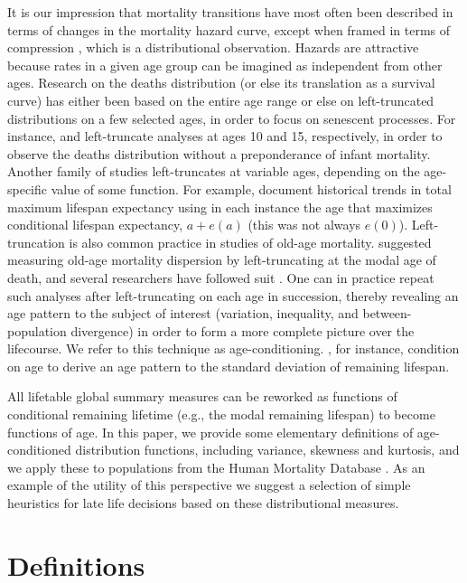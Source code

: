 \documentclass{article}
\begin{document}
It is our impression that mortality transitions have most
often been described in terms of changes in the mortality hazard curve, except
when framed in terms of compression \citep[e.g.,][]{fries1980aging}, which is a
distributional observation.
Hazards are attractive because rates in a given
age group can be imagined as independent from other ages. Research on
the deaths distribution (or else its translation as a survival curve) has either
been based on the entire age range
\citep[e.g.,][]{wilmoth1999rectangularization}
or else on left-truncated distributions on a few selected ages, in order to
focus on senescent processes.
For instance, \citet{edwards2005inequality} and \citet{gillespie2014divergence} left-truncate analyses at
ages 10 and 15, respectively, in order to observe the deaths distribution
without a preponderance of infant mortality. Another family of studies
left-truncates at variable ages, depending on the age-specific value of some
function. For example, \citet{romo2009maximum} document historical trends in
total maximum lifespan expectancy using in each instance the age that maximizes 
conditional lifespan expectancy, $a + e(a)$ (this was not
always $e(0)$). Left-truncation is also common practice in studies of old-age
mortality.
\citet{kannisto2001mode} suggested measuring old-age mortality dispersion by
left-truncating at the modal age of death, and several researchers have followed
suit \citep[e.g.,][among others]{Thatche2010,Ouellette2011}. One can in
practice repeat such analyses after left-truncating on each age in
succession, thereby revealing an age pattern to the subject of interest (variation, inequality, and
between-population divergence) in order to form a more complete picture over
the lifecourse. We refer to this technique as age-conditioning.
\citet{engelman2010implications}, for instance, condition on age to derive an
age pattern to the standard deviation of remaining lifespan.

All lifetable global
summary measures can be reworked as functions of conditional remaining lifetime
(e.g., the modal remaining lifespan) to become functions of age.
In this paper, we provide some elementary definitions of age-conditioned
distribution functions, including variance, skewness and kurtosis, and we apply
these to populations from the Human Mortality Database .
As an example of the utility of this perspective we suggest a selection of
simple heuristics for late life decisions based on these distributional measures.

\section*{Definitions}
\end{document}

